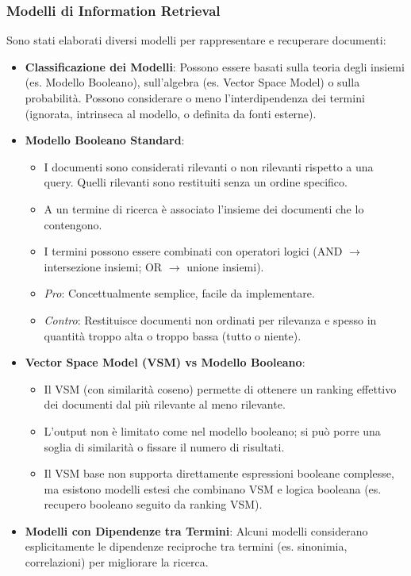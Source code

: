 \documentclass{article}
\begin{document}
\subsubsection{Modelli di Information Retrieval}
Sono stati elaborati diversi modelli per rappresentare e recuperare documenti:
\begin{itemize}
    \item \textbf{Classificazione dei Modelli}: Possono essere basati sulla teoria degli insiemi (es. Modello Booleano), sull'algebra (es. Vector Space Model) o sulla probabilità. Possono considerare o meno l'interdipendenza dei termini (ignorata, intrinseca al modello, o definita da fonti esterne).
    \item \textbf{Modello Booleano Standard}:
          \begin{itemize}
              \item I documenti sono considerati rilevanti o non rilevanti rispetto a una query. Quelli rilevanti sono restituiti senza un ordine specifico.
              \item A un termine di ricerca è associato l'insieme dei documenti che lo contengono.
              \item I termini possono essere combinati con operatori logici (AND $\rightarrow$ intersezione insiemi; OR $\rightarrow$ unione insiemi).
              \item \textit{Pro}: Concettualmente semplice, facile da implementare.
              \item \textit{Contro}: Restituisce documenti non ordinati per rilevanza e spesso in quantità troppo alta o troppo bassa (tutto o niente).
          \end{itemize}
    \item \textbf{Vector Space Model (VSM) vs Modello Booleano}:
          \begin{itemize}
              \item Il VSM (con similarità coseno) permette di ottenere un ranking effettivo dei documenti dal più rilevante al meno rilevante.
              \item L'output non è limitato come nel modello booleano; si può porre una soglia di similarità o fissare il numero di risultati.
              \item Il VSM base non supporta direttamente espressioni booleane complesse, ma esistono modelli estesi che combinano VSM e logica booleana (es. recupero booleano seguito da ranking VSM).
          \end{itemize}
    \item \textbf{Modelli con Dipendenze tra Termini}: Alcuni modelli considerano esplicitamente le dipendenze reciproche tra termini (es. sinonimia, correlazioni) per migliorare la ricerca.

\end{itemize}
\end{document}
